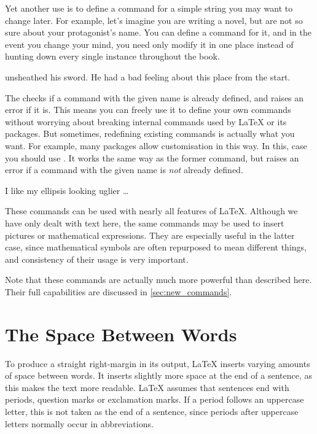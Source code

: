 Yet another use is to define a command for a simple string you may
want to change later. For example, let's imagine you are writing a novel, but
are not so sure about your protagonist's name. You can define a command for it,
and in the event you change your mind, you need only modify it
in one place instead of hunting down every single instance
throughout the book.
\begin{example}

\hero{} unsheathed his sword.
He  had a bad feeling about
this place from the start.
\end{example}

The  checks if a command with the given name is already
defined, and raises an error if it is. This means you can freely use it
to define your own commands without worrying about breaking internal
commands used by \LaTeX{} or its packages. But sometimes, redefining existing
commands is actually what you want. For example, many packages allow
customisation in this way. In this, case you should use
. It works the same way as the former command, but
raises an error if a command with the given name is \emph{not} already defined.
\begin{example}

I like my ellipsis looking
uglier \ldots
\end{example}

These commands can be used with nearly all features of \LaTeX{}. Although
we have only dealt with text here, the same commands may be used to insert
pictures or mathematical expressions. They are especially useful in the latter
case, since mathematical symbols are often repurposed to mean different things,
and consistency of their usage is very important.

Note that these commands are actually much more powerful than described here.
Their full capabilities are discussed in \autoref{sec:new_commands}.

\section{The Space Between Words}

To produce a straight right-margin in its output, \LaTeX{} inserts varying
amounts of space between words. It inserts slightly more space at
the end of a sentence, as this makes the text more readable.  \LaTeX{}
assumes that sentences end with periods, question marks or exclamation
marks. If a period follows an uppercase letter, this is not taken as the end
of a sentence, since periods after uppercase letters normally occur in
abbreviations.

